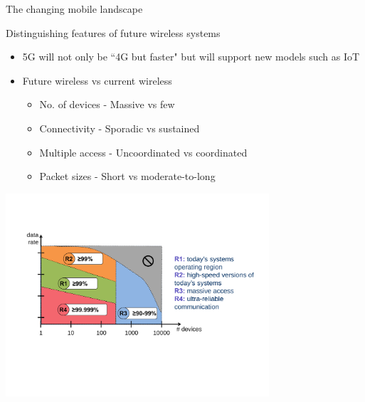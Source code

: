 \documentclass[10pt,xcolor=table]{beamer}
\begin{document}
\begin{frame}{The changing mobile landscape}
\vspace{-3mm}
\begin{block}{Distinguishing features of future wireless systems}
\begin{itemize}
\item 5G will not only be ``4G but faster" but will support new models such as IoT
\item Future wireless vs current wireless
    \begin{itemize}
      \item No. of devices - \alert{Massive} vs few
      \item Connectivity - \alert{Sporadic} vs sustained
      \item Multiple access - \alert{Uncoordinated} vs coordinated
      \item Packet sizes - \alert{Short} vs moderate-to-long
    \end{itemize}
\end{itemize}
\end{block}
\begin{center}
\includegraphics[width=3.85in]{./Figures/5Gchanginglandscape}
\end{center}
\end{frame}
\end{document}
